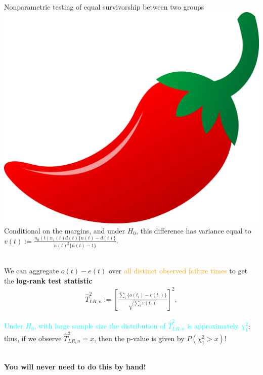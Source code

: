 \documentclass[10pt,t]{beamer}
\begin{document}
\begin{frame}{Nonparametric testing of equal survivorship between two groups \includegraphics[scale=0.01]{figs/chilipepper.png}}
Conditional on the margins, and under $H_0$, this difference has variance equal to $v(t) := \frac{n_0(t)n_1(t)d(t)\{n(t)-d(t)\}}{n(t)^2\{n(t) - 1\}}$.
\\ ~\ 

We can aggregate $o(t) - e(t)$ over \textcolor{orange}{all distinct observed failure times} to get the \textbf{log-rank test statistic}
\begin{align*}
\widehat{T}^2_{LR, n} := \left[\frac{\sum_i \{o(t_i) - e(t_i)\}}{\sqrt{\sum_iv(t_i)}} \right]^2,
\end{align*}

\textcolor{cyan}{Under $H_0$, with large sample size the distribution of $\widehat{T}^2_{LR, n}$ is approximately $\chi^2_1$}: thus, if we observe $\widehat{T}^2_{LR, n} = x$, then the p-value is given by $P(\chi^2_1 > x)$!
\\ ~\ 

\textbf{You will never need to do this by hand!}
\end{frame}
\end{document}
